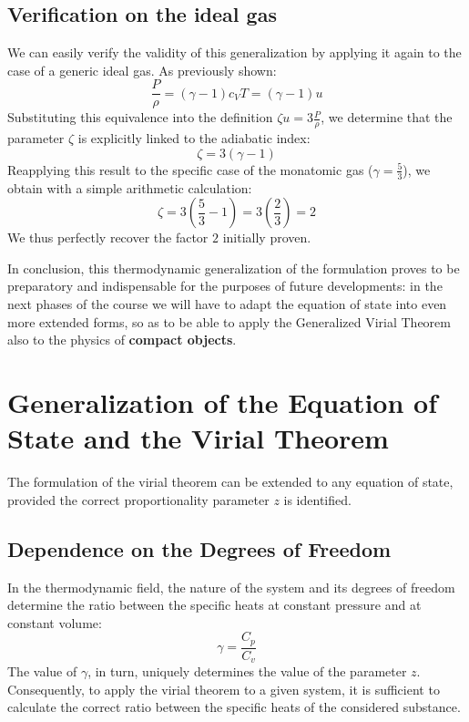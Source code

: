 \subsection{Verification on the ideal gas}
We can easily verify the validity of this generalization by applying it again to the case of a generic ideal gas. As previously shown:
\begin{equation}
\frac{P}{\rho} = (\gamma - 1) c_V T = (\gamma - 1) u
\end{equation}
Substituting this equivalence into the definition $\zeta u = 3 \frac{P}{\rho}$, we determine that the parameter $\zeta$ is explicitly linked to the adiabatic index:
\begin{equation}
\zeta = 3(\gamma - 1)
\end{equation}
Reapplying this result to the specific case of the monatomic gas ($\gamma = \frac{5}{3}$), we obtain with a simple arithmetic calculation:
\begin{equation}
\zeta = 3 \left( \frac{5}{3} - 1 \right) = 3 \left( \frac{2}{3} \right) = 2
\end{equation}
We thus perfectly recover the factor $2$ initially proven.

In conclusion, this thermodynamic generalization of the formulation proves to be preparatory and indispensable for the purposes of future developments: in the next phases of the course we will have to adapt the equation of state into even more extended forms, so as to be able to apply the Generalized Virial Theorem also to the physics of \textbf{compact objects}.

\section{Generalization of the Equation of State and the Virial Theorem}

The formulation of the virial theorem can be extended to any equation of state, provided the correct proportionality parameter $z$ is identified.

\subsection{Dependence on the Degrees of Freedom}
In the thermodynamic field, the nature of the system and its degrees of freedom determine the ratio between the specific heats at constant pressure and at constant volume:
\begin{equation}
\gamma = \frac{C_p}{C_v}
\end{equation}
The value of $\gamma$, in turn, uniquely determines the value of the parameter $z$. Consequently, to apply the virial theorem to a given system, it is sufficient to calculate the correct ratio between the specific heats of the considered substance.

